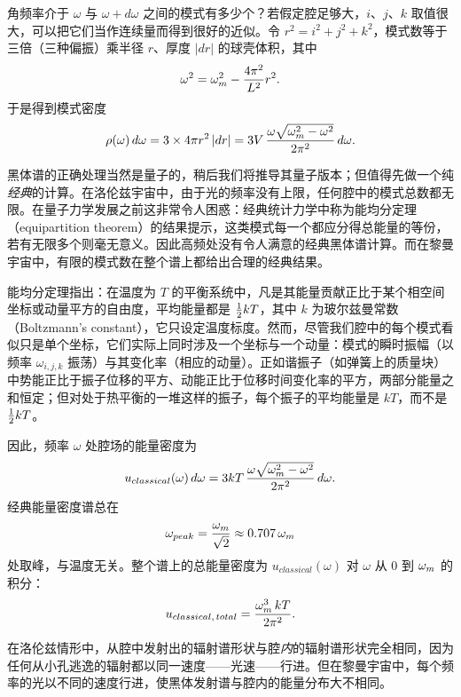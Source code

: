 角频率介于 $\omega$ 与 $\omega+d\omega$ 之间的模式有多少个？若假定腔足够大，$i$、$j$、$k$ 取值很大，可以把它们当作连续量而得到很好的近似。令 $r^{2}=i^{2}+j^{2}+k^{2}$，模式数等于三倍（三种偏振）乘半径 $r$、厚度 $|dr|$ 的球壳体积，其中
\begin{equation}
\omega^{2}=\omega_m^{2}-\frac{4\pi^{2}}{L^{2}}r^{2}.
\end{equation}
于是得到模式密度
\begin{equation}
\rho(\omega)\,d\omega=3\times 4\pi r^{2}\,|dr|
=3V\,\frac{\omega\sqrt{\omega_m^{2}-\omega^{2}}}{2\pi^{2}}\,d\omega .
\end{equation}


黑体谱的正确处理当然是量子的，稍后我们将推导其量子版本；但值得先做一个纯\emph{经典}的计算。在洛伦兹宇宙中，由于光的频率没有上限，任何腔中的模式总数都无限。在量子力学发展之前这非常令人困惑：经典统计力学中称为能均分定理（equipartition theorem）的结果提示，这类模式每一个都应分得总能量的等份，若有无限多个则毫无意义。因此高频处没有令人满意的经典黑体谱计算。而在黎曼宇宙中，有限的模式数在整个谱上都给出合理的经典结果。

能均分定理指出：在温度为 $T$ 的平衡系统中，凡是其能量贡献正比于某个相空间坐标或动量平方的自由度，平均能量都是 $\tfrac{1}{2} kT$，其中 $k$ 为玻尔兹曼常数（Boltzmann's constant），它只设定温度标度。然而，尽管我们腔中的每个模式看似只是单个坐标，它们实际上同时涉及一个坐标与一个动量：模式的瞬时振幅（以频率 $\omega_{i,j,k}$ 振荡）与其变化率（相应的动量）。正如谐振子（如弹簧上的质量块）中势能正比于振子位移的平方、动能正比于位移时间变化率的平方，两部分能量之和恒定；但对处于热平衡的一堆这样的振子，每个振子的平均能量是 $kT$，而不是 $\tfrac{1}{2} kT$。

因此，频率 $\omega$ 处腔场的能量密度为
\begin{equation}
u_{classical}(\omega)\,d\omega=3kT\,\frac{\omega\sqrt{\omega_m^{2}-\omega^{2}}}{2\pi^{2}}\,d\omega .
\end{equation}
经典能量密度谱总在
\begin{equation}
\omega_{peak}=\frac{\omega_m}{\sqrt2}\approx 0.707\,\omega_m
\end{equation}
处取峰，与温度无关。整个谱上的总能量密度为 $u_{classical}(\omega)$ 对 $\omega$ 从 $0$ 到 $\omega_m$ 的积分：
\begin{equation}
u_{classical,\,total}=\frac{\omega_m^{3}\,kT}{2\pi^{2}}.
\end{equation}

在洛伦兹情形中，从腔中发射出的辐射谱形状与腔\emph{内}的辐射谱形状完全相同，因为任何从小孔逃逸的辐射都以同一速度——光速——行进。但在黎曼宇宙中，每个频率的光以不同的速度行进，使黑体发射谱与腔内的能量分布大不相同。

